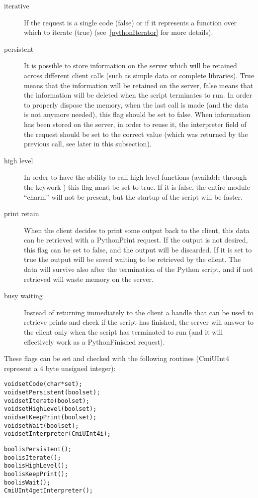 \begin{description}

\item[iterative]
If the request is a single code (false) or if it represents a function over
which to iterate (true) (see~\ref{pythonIterator} for more details).

\item[persistent]
It is possible to store information on the server which will be retained across
different client calls (such as simple data or complete libraries). True means
that the information will be retained on the server, false means that the
information will be deleted when the script terminates to run. In order to
properly dispose the memory, when the last call is made (and the data is not
anymore needed), this flag should be set to false. When information has been
stored on the server, in order to reuse it, the interpreter field of the request
should be set to the correct value (which was returned by the previous call, see
later in this subsection).

\item[high level]
In order to have the ability to call high level \charmpp{} functions (available
through the keywork ) this flag must be set to true. If it is false,
the entire module ``charm'' will not be present, but the startup of the script
will be faster.

\item[print retain]
When the client decides to print some output back to the client, this data can be
retrieved with a PythonPrint request. If the output is not desired, this flag
can be set to false, and the output will be discarded. If it is set to true the
output will be saved waiting to be retrieved by the client. The data will
survive also after the termination of the Python script, and if not retrieved
will waste memory on the server.

\item[busy waiting]
Instead of returning immediately to the client a handle that can be used to
retrieve prints and check if the script has finished, the server will answer to
the client only when the script has terminated to run (and it will effectively
work as a PythonFinished request).

\end{description}

These flags can be set and checked with the following routines (CmiUInt4 represent a 4
byte unsigned integer):

\begin{alltt}
void setCode(char *set);
void setPersistent(bool set);
void setIterate(bool set);
void setHighLevel(bool set);
void setKeepPrint(bool set);
void setWait(bool set);
void setInterpreter(CmiUInt4 i);

bool isPersistent();
bool isIterate();
bool isHighLevel();
bool isKeepPrint();
bool isWait();
CmiUInt4 getInterpreter();
\end{alltt}

